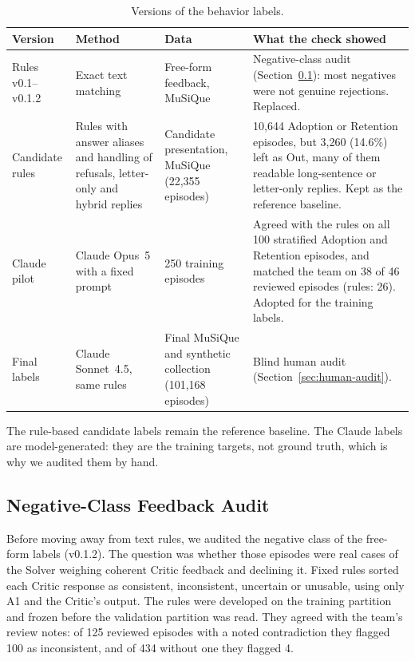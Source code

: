 \begin{table}[htbp]
    \centering
    \caption{Versions of the behavior labels.}
    \label{tab:label-versions}
    \small
    \begin{tabular}{p{2.3cm}p{3.5cm}p{3.3cm}p{5.6cm}}
        \toprule
        Version & Method & Data & What the check showed \tabularnewline
        \midrule
        \raggedright Rules v0.1--v0.1.2
            & \raggedright Exact text matching
            & \raggedright Free-form feedback, MuSiQue
            & \raggedright Negative-class audit
              (Section~\ref{sec:negative-audit}): most negatives were not
              genuine rejections. Replaced. \tabularnewline
        \raggedright Candidate rules
            & \raggedright Rules with answer aliases and handling of
              refusals, letter-only and hybrid replies
            & \raggedright Candidate presentation, MuSiQue (22,355 episodes)
            & \raggedright 10,644 Adoption or Retention episodes, but 3,260
              (14.6\%) left as Out, many of them readable long-sentence or
              letter-only replies. Kept as the reference baseline.
              \tabularnewline
        \raggedright Claude pilot
            & \raggedright Claude Opus~5 with a fixed prompt
            & \raggedright 250 training episodes
            & \raggedright Agreed with the rules on all 100 stratified
              Adoption and Retention episodes, and matched the team on 38 of
              46 reviewed episodes (rules: 26). Adopted for the training
              labels. \tabularnewline
        \raggedright Final labels
            & \raggedright Claude Sonnet~4.5, same rules
            & \raggedright Final MuSiQue and synthetic collection (101,168
              episodes)
            & \raggedright Blind human audit
              (Section~\ref{sec:human-audit}). \tabularnewline
        \bottomrule
    \end{tabular}
\end{table}

The rule-based candidate labels remain the reference baseline. The Claude
labels are model-generated: they are the training targets, not ground truth,
which is why we audited them by hand.

\subsection{Negative-Class Feedback Audit}
\label{sec:negative-audit}

Before moving away from text rules, we audited the negative class of the
free-form labels (v0.1.2). The question was whether those episodes were real
cases of the Solver weighing coherent Critic feedback and declining it. Fixed
rules sorted each Critic response as consistent, inconsistent, uncertain or
unusable, using only A1 and the Critic's output. The rules were developed on
the training partition and frozen before the validation partition was read.
They agreed with the team's review notes: of 125 reviewed episodes with a
noted contradiction they flagged 100 as inconsistent, and of 434 without one
they flagged 4.

